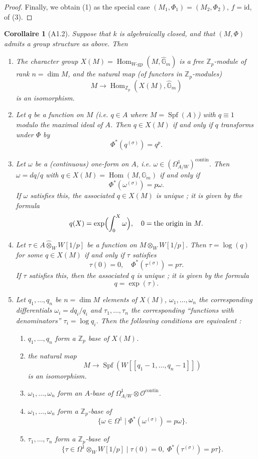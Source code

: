 \documentclass[12pt,a4paper]{article}
\theoremstyle{plain}
\newtheorem{corollary}[theorem]{Corollaire}
\theoremstyle{definition}
\theoremstyle{remark}
\DeclareMathOperator{\Hom}{Hom}
\DeclareMathOperator{\Spf}{Spf}
\providecommand{\Hom}{\operatorname{Hom}}
\begin{document}
\begin{proof}
Finally, we obtain (1) as the special case $(M_1, \Phi_1) = (M_2, \Phi_2)$, $f = \mathrm{id}$, of (3). \qedhere
\end{proof}

\begin{corollary}[A1.2]
Suppose that $k$ is algebraically closed, and that $(M, \Phi)$ admits a group structure as above. Then
\begin{enumerate}[label=(\arabic*)]
\item The character group $X(M) = \Hom_{W\text{-gp}}(M, \hat{\mathbb{G}}_m)$ is a free $\mathbb{Z}_p$-module of rank $n = \dim M$, and the natural map (of functors in $\mathbb{Z}_p$-modules)
\[
M \longrightarrow \Hom_{\mathbb{Z}_p}(X(M), \hat{\mathbb{G}}_m)
\]
is an isomorphism.
\item Let $q$ be a function on $M$ (i.e. $q \in A$ where $M = \Spf(A)$) with $q \equiv 1$ modulo the maximal ideal of $A$. Then $q \in X(M)$ if and only if $q$ transforms under $\Phi$ by
\[
\Phi^*(q^{(\sigma)}) = q^p.
\]
\item Let $\omega$ be a (continuous) one-form on $A$, i.e. $\omega \in (\Omega^1_{A/W})^{\mathrm{contin}}$. Then $\omega = dq/q$ with $q \in X(M) = \Hom(M, \mathbb{G}_m)$ if and only if
\[
\Phi^*(\omega^{(\sigma)}) = p\omega.
\]
If $\omega$ satisfies this, the associated $q \in X(M)$ is unique ; it is given by the formula
\[
q(X) = \exp\Bigl(\int_0^X \omega\Bigr), \quad 0 = \text{the origin in } M.
\]
\item Let $\tau \in A \hat{\otimes}_W W[1/p]$ be a function on $M \otimes_W W[1/p]$. Then $\tau = \log(q)$ for some $q \in X(M)$ if and only if $\tau$ satisfies
\[
\tau(0) = 0, \quad \Phi^*(\tau^{(\sigma)}) = p\tau.
\]
If $\tau$ satisfies this, then the associated $q$ is unique ; it is given by the formula
\[
q = \exp(\tau).
\]
\item Let $q_1, \ldots, q_n$ be $n = \dim M$ elements of $X(M)$, $\omega_1, \ldots, \omega_n$ the corresponding differentials $\omega_i = dq_i/q_i$ and $\tau_1, \ldots, \tau_n$ the corresponding ``functions with denominators'' $\tau_i = \log q_i$. Then the following conditions are equivalent :
\begin{enumerate}[label=\alph*)]
\item $q_1, \ldots, q_n$ form a $\mathbb{Z}_p$ base of $X(M)$.
\item the natural map
\[
M \longrightarrow \Spf(W[[q_1 - 1, \ldots, q_n - 1]])
\]
is an isomorphism.
\item $\omega_1, \ldots, \omega_n$ form an $A$-base of $\Omega^1_{A/W} \otimes \mathcal{O}^{\mathrm{contin}}$.
\item $\omega_1, \ldots, \omega_n$ form a $\mathbb{Z}_p$-base of
\[
\{\omega \in \Omega^1 \mid \Phi^*(\omega^{(\sigma)}) = p\omega\}.
\]
\item $\tau_1, \ldots, \tau_n$ form a $\mathbb{Z}_p$-base of
\[
\{\tau \in \Omega^1 \otimes_W W[1/p] \mid \tau(0) = 0, \; \Phi^*(\tau^{(\sigma)}) = p\tau\}.
\]
\end{enumerate}
\end{enumerate}
\end{corollary}
\end{document}
